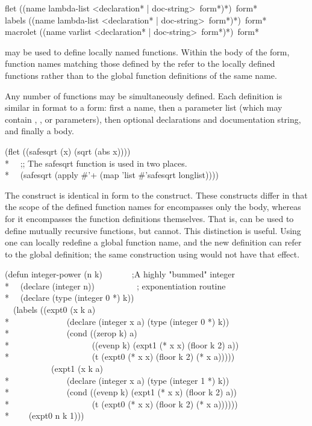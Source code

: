 \begin{defspec}
flet ({(name lambda-list
        <{declaration}* | doc-string> {\,form}*)}*)
     {\,form}* \\
labels ({(name lambda-list
          <{declaration}* | doc-string> {\,form}*)}*)
       {\,form}* \\
macrolet ({(name varlist
            <{declaration}* | doc-string> {\,form}*)}*)
         {\,form}*

 may be used to define locally named functions.  Within the
body of the  form, function names matching those defined
by the  refer to the locally defined functions rather than to
the global function definitions of the same name.

Any number of functions may be simultaneously defined.  Each definition
is similar in format to a  form: first a name,
then a parameter list (which may contain , , or 
parameters), then optional declarations and documentation string,
and finally a body.
\begin{lisp}
(flet ((safesqrt (x) (sqrt (abs x)))) \\*
~~;; The safesqrt function is used in two places. \\*
~~(safesqrt (apply \#'+ (map 'list \#'safesqrt longlist))))
\end{lisp}

The  construct is identical in form to the  construct.
These constructs differ
in that the scope of the defined function names for 
encompasses only the body, whereas for  it encompasses the
function definitions themselves.  That is,  can be used to
define mutually recursive functions, but  cannot.  This
distinction is useful.  Using  one can locally redefine a global
function name, and the new definition can refer to the global definition;
the same construction using  would not have that effect.
\begin{lisp}
(defun integer-power (n k)~~~~~~~;A highly "bummed" integer \\*
~~(declare (integer n))~~~~~~~~~~; exponentiation routine \\*
~~(declare (type (integer 0 *) k)) \\
~~(labels ((expt0 (x k a) \\*
~~~~~~~~~~~~~(declare (integer x a) (type (integer 0 *) k)) \\*
~~~~~~~~~~~~~(cond ((zerop k) a) \\*
~~~~~~~~~~~~~~~~~~~((evenp k) (expt1 (* x x) (floor k 2) a)) \\*
~~~~~~~~~~~~~~~~~~~(t (expt0 (* x x) (floor k 2) (* x a))))) \\
~~~~~~~~~~~(expt1 (x k a) \\*
~~~~~~~~~~~~~(declare (integer x a) (type (integer 1 *) k)) \\*
~~~~~~~~~~~~~(cond ((evenp k) (expt1 (* x x) (floor k 2) a)) \\*
~~~~~~~~~~~~~~~~~~~(t (expt0 (* x x) (floor k 2) (* x a)))))) \\*
~~~~(expt0 n k 1)))
\end{lisp}


\end{defspec}
